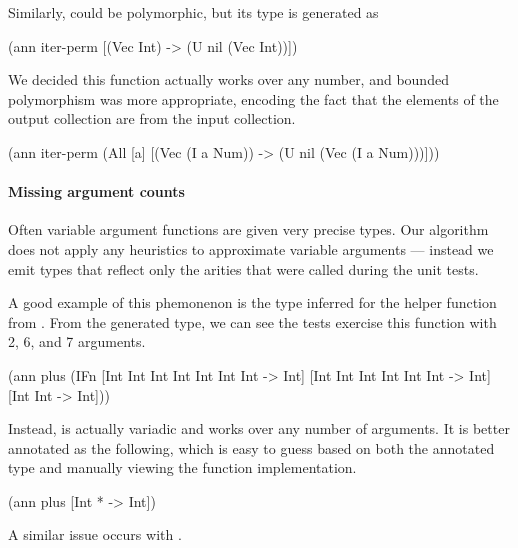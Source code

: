 Similarly,  could be polymorphic, 
but its type is generated as

\begin{cljlisting}
(ann iter-perm [(Vec Int) -> (U nil (Vec Int))])
\end{cljlisting}

We decided this function actually works over any number,
and bounded polymorphism was more appropriate, encoding
the fact that the elements of the output collection
are from the input collection.

\begin{cljlisting}
(ann iter-perm
  (All [a]
    [(Vec (I a Num)) -> (U nil (Vec (I a Num)))]))
\end{cljlisting}
%

\paragraph{Missing argument counts}
Often variable argument functions are given very precise types.
Our algorithm does not apply any heuristics to approximate
variable arguments --- instead we emit types that reflect
only the arities that were called during the unit tests.

A good example of this phemonenon is the type inferred
for the  helper function from .
From the generated type, we can see the tests exercise this function with 2, 6,
and 7 arguments.

\begin{cljlisting}
(ann plus
  (IFn [Int Int Int Int Int Int Int -> Int]
       [Int Int Int Int Int Int -> Int]
       [Int Int -> Int]))
\end{cljlisting}

Instead,  is actually variadic and works over any number of arguments.
It is better annotated as the following, which is easy to guess based on
both the annotated type and manually viewing the function implementation.

\begin{cljlisting}
(ann plus [Int * -> Int])
\end{cljlisting}

A similar issue occurs with .

